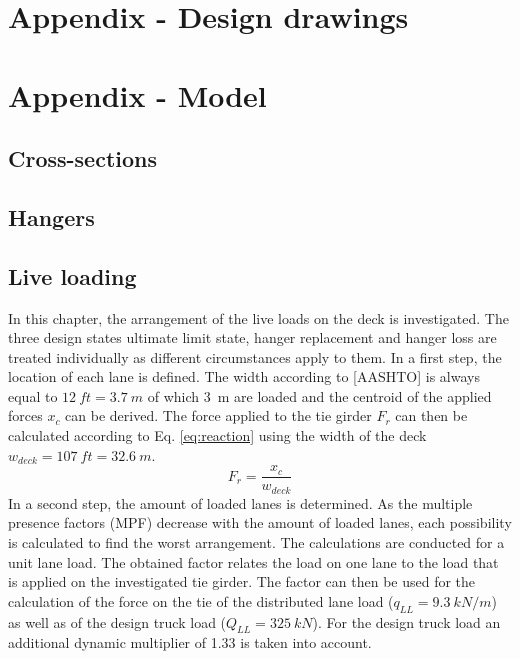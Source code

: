 \section{Appendix - Design drawings}
\section{Appendix - Model}
\label{AppendixModel}

\subsection{Cross-sections}

\subsection{Hangers}
\label{Appendix_A_Hangers}

\subsection{Live loading} \label{Appendix_Liveloading}
In this chapter, the arrangement of the live loads on the deck is investigated. The three design states ultimate limit state, hanger replacement and hanger loss are treated individually as different circumstances apply to them. In a first step, the location of each lane is defined. The width according to [AASHTO] is always equal to $\SI{12}{ft} = \SI{3.7}{m}$ of which \SI{3}{m} are loaded and the centroid of the applied forces $x_c$ can be derived. The force applied to the tie girder $F_r$ can then be calculated according to Eq. \ref{eq:reaction} using the width of the deck $w_{deck}=\SI{107}{ft}=\SI{32.6}{m}$.
\begin{equation}
    F_r = \frac{x_c}{w_{deck}}
    \label{eq:reaction}
\end{equation}
In a second step, the amount of loaded lanes is determined. As the multiple presence factors (MPF) decrease with the amount of loaded lanes, each possibility is calculated to find the worst arrangement. The calculations are conducted for a unit lane load. The obtained factor relates the load on one lane to the load that is applied on the investigated tie girder. The factor can then be used for the calculation of the force on the tie of the distributed lane load ($q_{LL}=\SI{9.3}{kN/m}$) as well as of the design truck load ($Q_{LL}=\SI{325}{kN}$). For the design truck load an additional dynamic multiplier of 1.33 is taken into account. 

